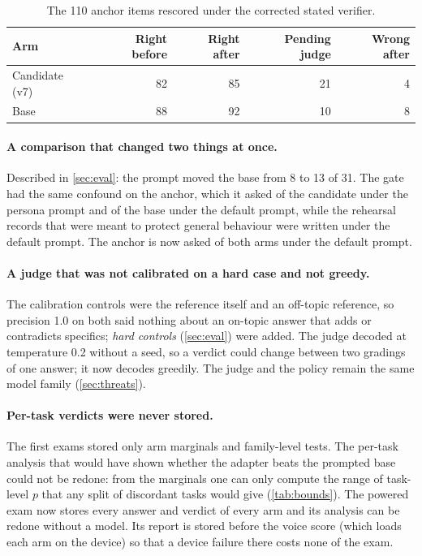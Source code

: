 \begin{table}[t]
\centering\small
\begin{tabular}{@{}lrrrr@{}}
\toprule
Arm & Right before & Right after & Pending judge & Wrong after \\
\midrule
Candidate (v7) & 82 & 85 & 21 & 4 \\
Base & 88 & 92 & 10 & 8 \\
\bottomrule
\end{tabular}
\caption{The 110 anchor items rescored under the corrected stated verifier.}
\label{tab:rescore}
\end{table}

\paragraph{A comparison that changed two things at once.}
Described in \cref{sec:eval}: the prompt moved the base from 8 to 13 of 31. The gate had the same
confound on the anchor, which it asked of the candidate under the persona prompt and of the base
under the default prompt, while the rehearsal records that were meant to protect general
behaviour were written under the default prompt. The anchor is now asked of both arms under
the default prompt.

\paragraph{A judge that was not calibrated on a hard case and not greedy.}
The calibration controls were the reference itself and an off-topic reference, so precision
1.0 on both said nothing about an on-topic answer that adds or contradicts specifics;
\emph{hard controls} (\cref{sec:eval}) were added. The judge decoded at temperature 0.2 without
a seed, so a verdict could change between two gradings of one answer; it now decodes greedily.
The judge and the policy remain the same model family (\cref{sec:threats}).

\paragraph{Per-task verdicts were never stored.}
The first exams stored only arm marginals and family-level tests. The per-task analysis that would
have shown whether the adapter beats the prompted base could not be redone: from the marginals
one can only compute the range of task-level $p$ that any split of discordant tasks would give
(\cref{tab:bounds}). The powered exam now stores every answer and verdict of every arm and
its analysis can be redone without a model. Its report is stored before the voice score
(which loads each arm on the device) so that a device failure there costs none of the exam.

